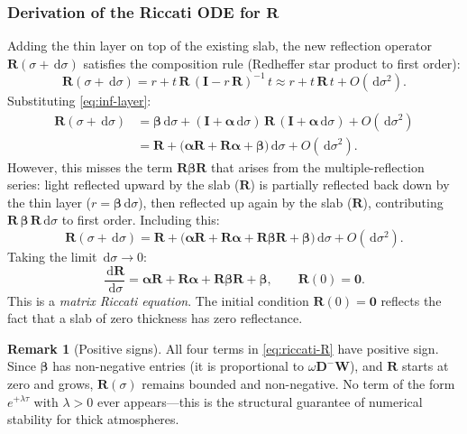 \documentclass[11pt,a4paper]{article}
\newcommand{\mat}[1]{\mathbf{#1}}
\newcommand{\dd}{\,\mathrm{d}}
\theoremstyle{definition}
\newtheorem{remark}{Remark}
\begin{document}
\subsubsection{Derivation of the Riccati ODE for \texorpdfstring{$\mat{R}$}{R}}

Adding the thin layer on top of the existing slab, the new reflection
operator $\mat{R}(\sigma + \dd\sigma)$ satisfies the composition rule
(Redheffer star product to first order):
\begin{equation}\label{eq:R-composition}
  \mat{R}(\sigma + \dd\sigma)
  = r + t\,\mat{R}\,(\mat{I} - r\,\mat{R})^{-1}\,t
  \approx r + t\,\mat{R}\,t + O(\dd\sigma^2).
\end{equation}
Substituting \eqref{eq:inf-layer}:
\begin{align}
  \mat{R}(\sigma + \dd\sigma)
  &= \mat{\beta}\dd\sigma
     + (\mat{I} + \mat{\alpha}\dd\sigma)\,\mat{R}\,
       (\mat{I} + \mat{\alpha}\dd\sigma) + O(\dd\sigma^2) \nonumber \\
  &= \mat{R} + \bigl(\mat{\alpha}\mat{R}
     + \mat{R}\mat{\alpha} + \mat{\beta}\bigr)\dd\sigma
     + O(\dd\sigma^2).
\end{align}
However, this misses the term $\mat{R}\mat{\beta}\mat{R}$ that arises
from the multiple-reflection series: light reflected upward by the slab
($\mat{R}$) is partially reflected back down by the thin layer ($r =
\mat{\beta}\dd\sigma$), then reflected up again by the slab
($\mat{R}$), contributing $\mat{R}\,\mat{\beta}\,\mat{R}\dd\sigma$ to
first order.  Including this:
\begin{equation}\label{eq:R-increment}
  \mat{R}(\sigma + \dd\sigma)
  = \mat{R} + \bigl(\mat{\alpha}\mat{R}
    + \mat{R}\mat{\alpha}
    + \mat{R}\mat{\beta}\mat{R}
    + \mat{\beta}\bigr)\dd\sigma
    + O(\dd\sigma^2).
\end{equation}
Taking the limit $\dd\sigma \to 0$:
\begin{equation}\label{eq:riccati-R}
  \boxed{
    \frac{\dd\mat{R}}{\dd\sigma}
    = \mat{\alpha}\mat{R} + \mat{R}\mat{\alpha}
      + \mat{R}\mat{\beta}\mat{R} + \mat{\beta},
    \qquad \mat{R}(0) = \mat{0}.
  }
\end{equation}
This is a \emph{matrix Riccati equation}.  The initial condition
$\mat{R}(0) = \mat{0}$ reflects the fact that a slab of zero thickness
has zero reflectance.

\begin{remark}[Positive signs]\label{rem:positive}
All four terms in \eqref{eq:riccati-R} have positive sign.  Since
$\mat{\beta}$ has non-negative entries (it is proportional to
$\omega \mat{D}^-\mat{W}$), and $\mat{R}$ starts at zero and grows,
$\mat{R}(\sigma)$ remains bounded and non-negative.  No term of the
form $e^{+\lambda\tau}$ with $\lambda > 0$ ever appears---this is the
structural guarantee of numerical stability for thick atmospheres.
\end{remark}
\end{document}
